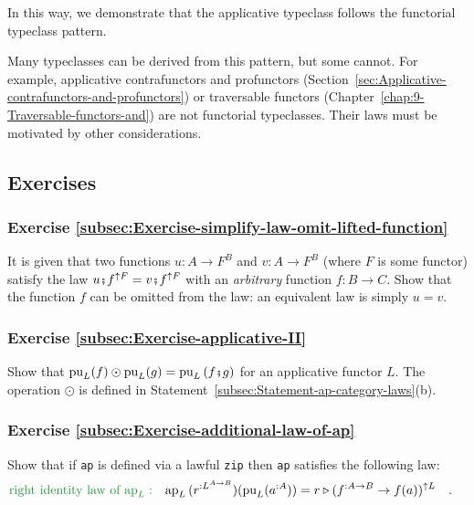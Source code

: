 In this way, we demonstrate that the applicative typeclass follows
the functorial typeclass pattern. 

Many typeclasses can be derived from this pattern, but some cannot.
For example, applicative contrafunctors and profunctors (Section~\ref{sec:Applicative-contrafunctors-and-profunctors})
or traversable functors (Chapter~\ref{chap:9-Traversable-functors-and})
are not functorial typeclasses. Their laws must be motivated by other
considerations.

\subsection{Exercises}

\subsubsection{Exercise \label{subsec:Exercise-simplify-law-omit-lifted-function}\ref{subsec:Exercise-simplify-law-omit-lifted-function}}

It is given that two functions $u:A\rightarrow F^{B}$ and $v:A\rightarrow F^{B}$
(where $F$ is some functor) satisfy the law $u\bef f^{\uparrow F}=v\bef f^{\uparrow F}$
with an \emph{arbitrary} function $f:B\rightarrow C$. Show that the
function $f$ can be omitted from the law: an equivalent law is simply
$u=v$.

\subsubsection{Exercise \label{subsec:Exercise-applicative-II}\ref{subsec:Exercise-applicative-II}}

Show that $\text{pu}_{L}(f)\odot\text{pu}_{L}(g)=\text{pu}_{L}\left(f\bef g\right)$
for an applicative functor $L$. The operation $\odot$ is defined
in Statement~\ref{subsec:Statement-ap-category-laws}(b).


\subsubsection{Exercise \label{subsec:Exercise-additional-law-of-ap}\ref{subsec:Exercise-additional-law-of-ap}}

Show that if \lstinline!ap! is defined via a lawful \lstinline!zip!
then \lstinline!ap! satisfies the following law:
\begin{align*}
{\color{greenunder}\text{right identity law of }\text{ap}_{L}:}\quad & \text{ap}_{L}\,(r^{:L^{A\rightarrow B}})(\text{pu}_{L}(a^{:A}))=r\triangleright(f^{:A\rightarrow B}\rightarrow f(a))^{\uparrow L}\quad.
\end{align*}


